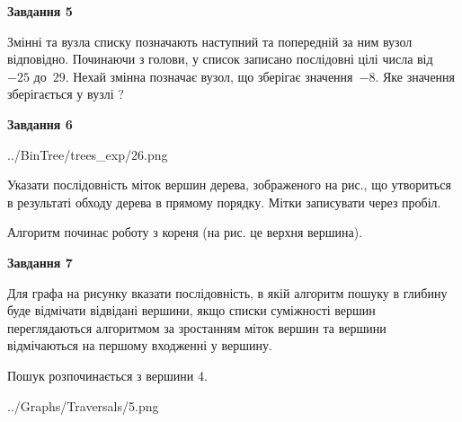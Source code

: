 \documentclass[12pt, ukrainian]{article}
\begin{document}
{\begin {large}
{\begin {center}\textbf{Завдання 5}\end {center}}\par
Змінні  та  вузла списку позначають наступний та попередній за ним вузол відповідно. Починаючи з голови, у список записано послідовні цілі числа від~$-25$ до~$29$. Нехай змінна  позначає вузол, що зберігає значення~$-8$.
Яке значення зберігається у вузлі  ?\par
\newpage

{\begin {center}\textbf{Завдання 6}\end {center}}\par

\begin{center}
	{../BinTree/trees_exp/26.png}
\end{center}
Указати послідовність міток вершин дерева, зображеного на рис., що утвориться в результаті обходу дерева в прямому порядку. Мітки записувати через пробіл.\par Алгоритм починає роботу з кореня (на рис. це верхня вершина).\par
\newpage

{\begin {center}\textbf{Завдання 7}\end {center}}\par
Для графа на рисунку вказати послідовність, в якій алгоритм пошуку в глибину буде відмічати відвідані вершини, якщо списки суміжності вершин переглядаються алгоритмом за зростанням міток вершин та вершини відмічаються на першому вход\-женні у вершину.\par
Пошук розпочинається з вершини 4.\par

\begin{center}
	{../Graphs/Traversals/5.png}
\end{center}\par
\newpage


\end{large}}
\end{document}
